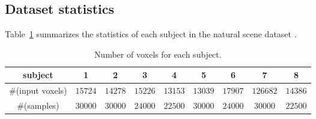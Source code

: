 \subsection{Dataset statistics}
Table~\ref{tab:num_voxels} summarizes the statistics of each subject in the natural scene dataset \cite{allen2022massive}. 
\begin{table}[htbp]
    \caption{Number of voxels for each subject.}
    \label{tab:num_voxels}
    \vskip 0.1in
    \centering
    \begin{tabular}{c|cccccccc}
    \toprule
        subject & 1 & 2 & 3 & 4 & 5 & 6 & 7 & 8 \\
        \midrule
        \#(input voxels) & $15724$ & $14278$ & $15226$ & $13153$ & $13039$ & $17907$ & $126682$ & $14386$ \\
        \#(samples) & $30000$ & $30000$ & $24000$ & $22500$ & $30000$ & $24000$ & $30000$ & $22500$ \\
        \bottomrule
    \end{tabular}
\end{table}





